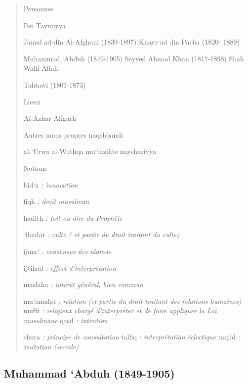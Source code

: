 \begin{quote}
{Personnes}

Ibn Taymiyya

Jamal ad-din Al-Afghani (1839-1897) Khayr-ad din Pacha (1820- 1889)

Muhammad `Abduh (1849-1905) Seyyed Ahmad Khan (1817-1898) Shah Walli
Allah

Tahtawi (1801-1873)

{Lieux}

Al-Azhar Aligarh

{Autres noms propres} naqshbandi

al-`Urwa al-Wuthqa mu`tazilite nayshariyya

{Notions}

bid\emph{`}a \emph{: innovation}

fiqh \emph{: droit musulman}

hadith \emph{: fait ou dire du Prophète}

\emph{`}ibadat \emph{: culte ( et partie du droit traitant du culte)}

ijma\emph{` : consensus des ulamas}

ijtihad \emph{: effort d'interprétation}

maslaha \emph{: intérêt général, bien commun}

mu\emph{`}amalat \emph{: relation (et partie du droit traitant des
relations humaines)} mufti \emph{: religieux chargé d'interpréter et de
faire appliquer la Loi musulmane} qasd \emph{: intention}

shura \emph{: principe de consultation} talfiq \emph{: interprétation
éclectique} taqlid \emph{: imitation (servile)}
\end{quote}

\hypertarget{muhammad-abduh-1849-1905}{%
\subsection{\texorpdfstring{{Muhammad `Abduh}
(1849-1905)}{Muhammad `Abduh (1849-1905)}}\label{muhammad-abduh-1849-1905}}


